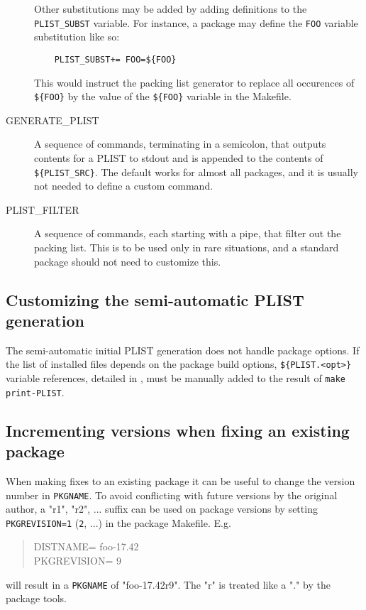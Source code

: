 \begin{description}
   Other substitutions may be added by adding definitions to the {\tt
   PLIST\_SUBST} variable. For instance, a package may define the {\tt FOO}
   variable substitution like so:
\begin{verbatim}
	PLIST_SUBST+= FOO=${FOO}
\end{verbatim}
   This would instruct the packing list generator to replace all occurences of
   {\tt\$\{FOO\}} by the value of the {\tt\$\{FOO\}} variable in the Makefile.

   \smallbreak
   \item[GENERATE\_PLIST]
   A sequence of commands, terminating in a semicolon, that outputs contents
   for a PLIST to stdout and is appended to the contents of
   {\tt\$\{PLIST\_SRC\}}. The default works for almost all packages, and it is
   usually not needed to define a custom command.

   \smallbreak
   \item[PLIST\_FILTER]
   A sequence of commands, each starting with a pipe, that filter out the
   packing list. This is to be used only in rare situations, and a standard
   package should not need to customize this.

\end{description}


\subsection{Customizing the semi-automatic PLIST generation} %
\label{section:genvars:print-PLIST}

The semi-automatic  initial PLIST generation  does not handle  package options.
If  the  list  of  installed  files  depends  on  the  package  build  options,
{\tt\$\{PLIST.<opt>\}}       variable       references,       detailed       in
,    must   be
manually added to the result of {\tt make print-PLIST}.


\subsection{Incrementing versions when fixing an existing package} %
\label{section:genvars:PKGREVISION}

When making fixes to an existing package it can be useful to change the version
number in {\tt PKGNAME}. To avoid conflicting with future versions by the
original author, a "r1", "r2", ... suffix can be used on package versions by
setting {\tt PKGREVISION=1} ({\tt 2}, ...) in the package Makefile. E.g.
\begin{quote}
   DISTNAME=             foo-17.42\\
   PKGREVISION=          9
\end{quote}
will result in a {\tt PKGNAME} of "foo-17.42r9". The "r" is treated like a "."
by the package tools.

